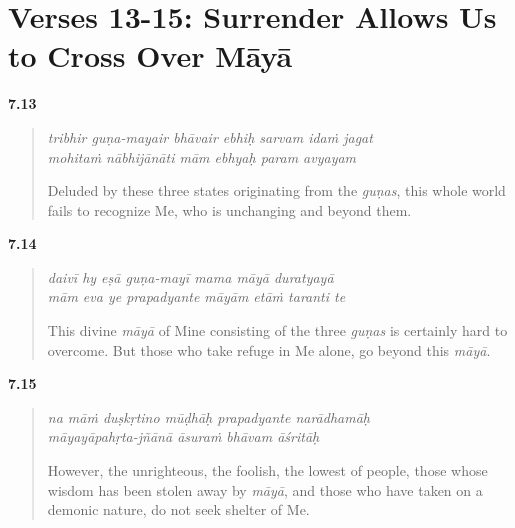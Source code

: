\section{Verses 13-15: Surrender Allows Us to Cross Over Māyā}\label{sec-verses-13-15-surrender-allows-us-to-cross-over-maya}


\par\noindent\textbf{7.13}\par
\begin{verse}
\textit{tribhir guṇa-mayair bhāvair ebhiḥ sarvam idaṁ jagat} \\
\textit{mohitaṁ nābhijānāti mām ebhyaḥ param avyayam}

\noindent Deluded by these three states originating from the \textit{guṇas}, this whole world fails to recognize Me, who is unchanging and beyond them.
\end{verse}
\par



\par\noindent\textbf{7.14}\par
\begin{verse}
\textit{daivī hy eṣā guṇa-mayī mama māyā duratyayā} \\
\textit{mām eva ye prapadyante māyām etāṁ taranti te}

\noindent This divine \textit{māyā} of Mine consisting of the three \textit{guṇas} is certainly hard to overcome. But those who take refuge in Me alone, go beyond this \textit{māyā}.
\end{verse}
\par



\par\noindent\textbf{7.15}\par
\begin{verse}
\textit{na māṁ duṣkṛtino mūḍhāḥ prapadyante narādhamāḥ} \\
\textit{māyayāpahṛta-jñānā āsuraṁ bhāvam āśritāḥ}

\noindent However, the unrighteous, the foolish, the lowest of people, those whose wisdom has been stolen away by \textit{māyā}, and those who have taken on a demonic nature, do not seek shelter of Me.
\end{verse}
\par


